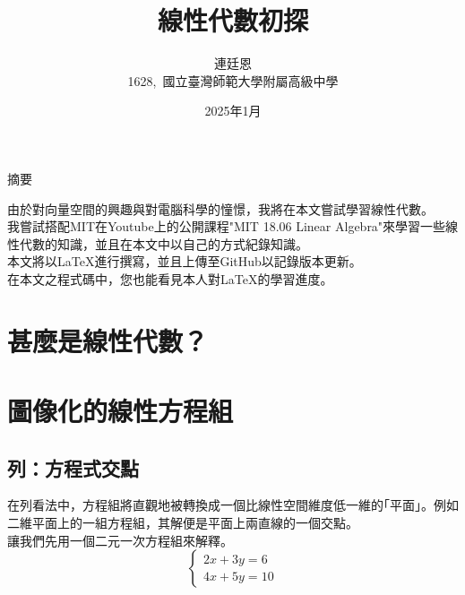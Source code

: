 \documentclass{article}
\title{線性代數初探}
\author{連廷恩\\
    1628,\ 國立臺灣師範大學附屬高級中學}
\date{2025年1月}
\begin{document}
    \begin{titlepage}
        \maketitle
        \vspace{2cm}
    \end{titlepage}

    \centerline{\huge{摘要}}\vspace{2cm}\par
        由於對向量空間的興趣與對電腦科學的憧憬，我將在本文嘗試學習線性代數。\\
        我嘗試搭配MIT在Youtube上的公開課程"MIT 18.06 Linear Algebra"來學習一些線性代數的知識，並且在本文中以自己的方式紀錄知識。\\
        本文將以\LaTeX 進行撰寫，並且上傳至GitHub以記錄版本更新。\\
        在本文之程式碼中，您也能看見本人對\LaTeX 的學習進度。\\

    \tableofcontents
    \newpage
    \section{甚麼是線性代數？}
    \newpage
    \section{圖像化的線性方程組}
    \subsection{列：方程式交點}
        \par
        在列看法中，方程組將直觀地被轉換成一個比線性空間維度低一維的｢平面」。例如二維平面上的一組方程組，其解便是平面上兩直線的一個交點。\\
        讓我們先用一個二元一次方程組來解釋。\\

        \begin{equation}
            \left\{
                \begin{array}{c}
                    2x + 3y = 6\\
                    4x + 5y = 10
                \end{array}
            \right.
        \end{equation}
\end{document}
